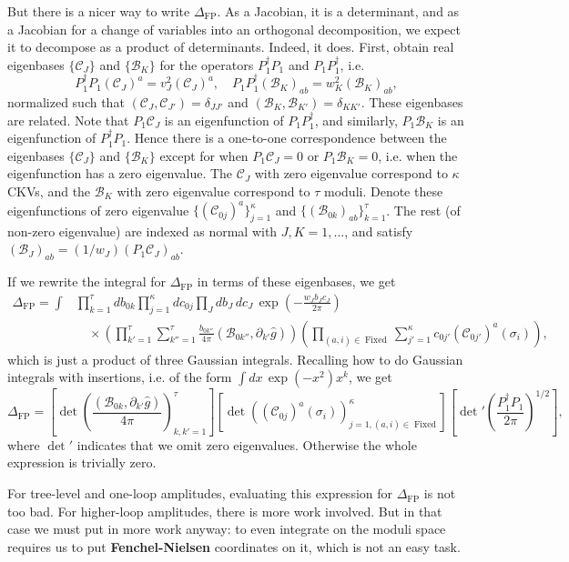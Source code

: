 \documentclass{report}
\theoremstyle{plain}
\theoremstyle{definition}
\theoremstyle{remark}
\newcommand{\di}{\partial}
\newcommand{\cB}{\mathcal{B}}
\newcommand{\cC}{\mathcal{C}}
\DeclareMathOperator{\Fixed}{Fixed}
\begin{document}
But there is a nicer way to write $\Delta_{\text{FP}}$. As a Jacobian,
it is a determinant, and as a Jacobian for a change of variables into
an orthogonal decomposition, we expect it to decompose as a product of
determinants. Indeed, it does. First, obtain real eigenbases
$\{\cC_J\}$ and $\{\cB_K\}$ for the operators $P_1^\dag P_1$ and $P_1
P_1^\dag$, i.e.
\[ P_1^\dag P_1 (\cC_J)^a = v_J^2 (\cC_J)^a, \quad P_1 P_1^\dag (\cB_K)_{ab} = w_K^2 (\cB_K)_{ab}, \]
normalized such that $(\cC_J, \cC_{J'}) = \delta_{JJ'}$ and $(\cB_K,
\cB_{K'}) = \delta_{KK'}$. These eigenbases are related. Note that
$P_1\cC_J$ is an eigenfunction of $P_1P_1^\dag$, and similarly,
$P_1\cB_K$ is an eigenfunction of $P_1^\dag P_1$. Hence there is a
one-to-one correspondence between the eigenbases $\{\cC_J\}$ and
$\{\cB_K\}$ except for when $P_1\cC_J = 0$ or $P_1\cB_K = 0$, i.e.
when the eigenfunction has a zero eigenvalue. The $\cC_J$ with zero
eigenvalue correspond to $\kappa$ CKVs, and the $\cB_K$ with zero
eigenvalue correspond to $\tau$ moduli. Denote these eigenfunctions of
zero eigenvalue $\{(\cC_{0j})^a\}_{j=1}^\kappa$ and
$\{(\cB_{0k})_{ab}\}_{k=1}^\tau$. The rest (of non-zero eigenvalue)
are indexed as normal with $J, K = 1, \ldots$, and satisfy
$(\cB_J)_{ab} = (1/w_J)(P_1 \cC_J)_{ab}$.

If we rewrite the integral for $\Delta_{\text{FP}}$ in terms of these
eigenbases, we get
\begin{align*}
  \Delta_{\text{FP}} = \int &\prod_{k=1}^\tau db_{0k} \prod_{j=1}^\kappa dc_{0j} \prod_J db_J \, dc_J \, \exp\left(-\frac{w_J b_J c_J}{2\pi}\right) \\
  &\quad \times \left(\prod_{k'=1}^\tau \sum_{k''=1}^\tau \frac{b_{0k''}}{4\pi} (\cB_{0k''}, \di_{k'}\hat{g})\right) \left(\prod_{(a,i) \in \Fixed} \sum_{j'=1}^\kappa c_{0j'} (\cC_{0j'})^a(\sigma_i)\right),
\end{align*}
which is just a product of three Gaussian integrals. Recalling how to
do Gaussian integrals with insertions, i.e. of the form $\int dx \,
\exp(-x^2) x^k$, we get
\[ \Delta_{\text{FP}} = \left[\det\left(\frac{(\cB_{0k}, \di_{k'}\hat{g})}{4\pi}\right)_{k,k'=1}^\tau\right]\left[\det\left((\cC_{0j})^a(\sigma_i)\right)_{j=1, (a,i) \in \Fixed}^\kappa\right] \left[\det\nolimits' \left(\frac{P_1^\dag P_1}{2\pi}\right)^{1/2}\right], \]
where $\det'$ indicates that we omit zero eigenvalues. Otherwise the
whole expression is trivially zero.

For tree-level and one-loop amplitudes, evaluating this expression for
$\Delta_{\text{FP}}$ is not too bad. For higher-loop amplitudes, there
is more work involved. But in that case we must put in more work
anyway: to even integrate on the moduli space requires us to put {\bf
  Fenchel-Nielsen} coordinates on it, which is not an easy task.
\end{document}
